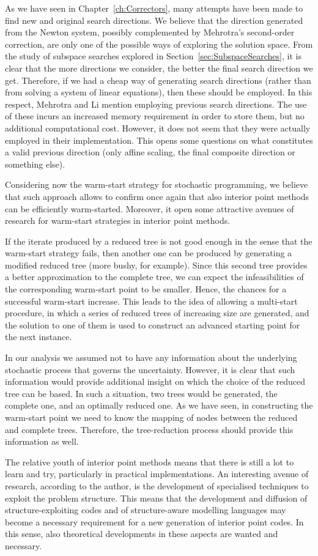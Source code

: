 As we have seen in Chapter~\ref{ch:Correctors}, many attempts
have been made to find new and original search directions.
We believe that the direction generated from the Newton system,
possibly complemented by Mehrotra's second-order correction,
are only one of the possible ways of exploring the solution space.
From the study of subspace searches explored in
Section~\ref{sec:SubspaceSearches}, it is clear that the more 
directions we consider, the better the final search direction 
we get. Therefore, if we had a cheap way of generating search
directions (rather than from solving a system of linear equations),
then these should be employed.
In this respect, Mehrotra and Li \cite{MehrotraLi} 
mention employing previous search directions.
The use of these incurs an increased memory requirement
in order to store them, but no additional computational cost.
However, it does not seem that they were actually employed in
their implementation.
This opens some questions on what constitutes a valid
previous direction (only affine scaling, the final composite direction
or something else).

Considering now the warm-start strategy for stochastic programming,
we believe that such approach allows to confirm once again 
that also interior point methods can be efficiently warm-started.
Moreover, it open some attractive avenues of 
research for warm-start strategies in interior point methods.

If the iterate produced by a reduced tree is not good enough 
in the sense that the warm-start strategy fails, then another one 
can be produced by generating a modified reduced tree (more 
bushy, for example).
Since this second tree provides a better approximation to the
complete tree, we can expect the infeasibilities of the 
corresponding warm-start point to be smaller.
Hence, the chances for a successful 
warm-start increase.
This leads to the idea of allowing a multi-start procedure, in
which a series of reduced trees of increasing size are generated,
and the solution to one of them is used to construct an 
advanced starting point for the next instance.

In our analysis we assumed not to have any information about the
underlying stochastic process that governs the uncertainty.
However, it is clear that such information would provide additional
insight on which the choice of the reduced tree can be based.
In such a situation, two trees would be generated, the complete one,
and an optimally reduced one.
As we have seen, in constructing the warm-start point we need
to know the mapping of nodes between the reduced and complete trees.
Therefore, the tree-reduction process should provide this information
as well.

The relative youth of interior point methods means that there is still
a lot to learn and try, particularly in practical implementations.
An interesting avenue of research, according to the author, is the development
of specialised techniques to exploit the problem structure.
This means that the development and diffusion of structure-exploiting
codes and of structure-aware modelling languages may become a necessary
requirement for a new generation of interior point codes.
In this sense, also theoretical developments in these aspects are 
wanted and necessary.
